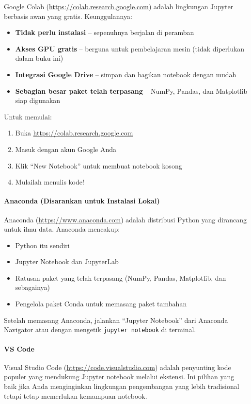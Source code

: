 Google Colab (\url{https://colab.research.google.com}) adalah lingkungan Jupyter berbasis awan yang gratis. Keunggulannya:
\begin{itemize}
\item \textbf{Tidak perlu instalasi} -- sepenuhnya berjalan di peramban
\item \textbf{Akses GPU gratis} -- berguna untuk pembelajaran mesin (tidak diperlukan dalam buku ini)
\item \textbf{Integrasi Google Drive} -- simpan dan bagikan notebook dengan mudah
\item \textbf{Sebagian besar paket telah terpasang} -- NumPy, Pandas, dan Matplotlib siap digunakan
\end{itemize}

Untuk memulai:
\begin{enumerate}
\item Buka \url{https://colab.research.google.com}
\item Masuk dengan akun Google Anda
\item Klik ``New Notebook'' untuk membuat notebook kosong
\item Mulailah menulis kode!
\end{enumerate}

\paragraph{Anaconda (Disarankan untuk Instalasi Lokal)}

Anaconda (\url{https://www.anaconda.com}) adalah distribusi Python yang dirancang untuk ilmu data. Anaconda mencakup:
\begin{itemize}
\item Python itu sendiri
\item Jupyter Notebook dan JupyterLab
\item Ratusan paket yang telah terpasang (NumPy, Pandas, Matplotlib, dan sebagainya)
\item Pengelola paket Conda untuk memasang paket tambahan
\end{itemize}

Setelah memasang Anaconda, jalankan ``Jupyter Notebook'' dari Anaconda Navigator atau dengan mengetik \texttt{jupyter notebook} di terminal.

\paragraph{VS Code}

Visual Studio Code (\url{https://code.visualstudio.com}) adalah penyunting kode populer yang mendukung Jupyter notebook melalui ekstensi. Ini pilihan yang baik jika Anda menginginkan lingkungan pengembangan yang lebih tradisional tetapi tetap memerlukan kemampuan notebook.

